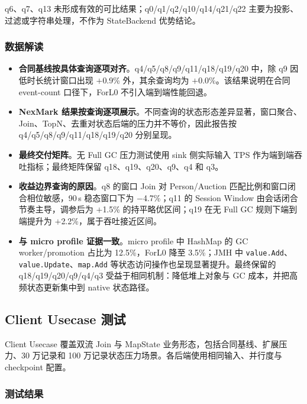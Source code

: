 \documentclass[a4paper,11pt]{article}
\begin{document}
q6、q7、q13 未形成有效的可比结果；q0/q1/q2/q10/q14/q21/q22 主要为投影、过滤或字符串处理，不作为 StateBackend 优势结论。

\subsubsection{数据解读}

\begin{itemize}
  \item \textbf{合同基线按具体查询逐项对齐}。q4/q5/q8/q9/q11/q18/q19/q20 中，除 q9 因低时长统计窗口出现 $+$0.9\% 外，其余查询均为 $+$0.0\%。该结果说明在合同 event-count 口径下，ForL0 不引入端到端性能回退。
  \item \textbf{NexMark 结果按查询逐项展示}。不同查询的状态形态差异显著，窗口聚合、Join、TopN、去重对状态后端的压力并不等价，因此报告按 q4/q5/q8/q9/q11/q18/q19/q20 分别呈现。
  \item \textbf{最终交付矩阵}。无 Full GC 压力测试使用 sink 侧实际输入 TPS 作为端到端吞吐指标；最终矩阵保留 q18、q19、q20、q9、q4 和 q3。
  \item \textbf{收益边界查询的原因}。q8 的窗口 Join 对 Person/Auction 匹配比例和窗口闭合相位敏感，90\,s 稳态窗口下为 $-$4.7\%；q11 的 Session Window 由会话闭合节奏主导，调参后为 $+$1.5\% 的持平略优区间；q19 在无 Full GC 规则下端到端提升为 $+$2.2\%，属于吞吐接近区间。
  \item \textbf{与 micro profile 证据一致}。micro profile 中 HashMap 的 GC worker/promotion 占比为 12.5\%，ForL0 降至 3.5\%；JMH 中 \texttt{value.Add}、\texttt{value.Update}、\texttt{map.Add} 等状态访问操作也呈现显著提升。最终保留的 q18/q19/q20/q9/q4/q3 受益于相同机制：降低堆上对象与 GC 成本，并把高频状态更新集中到 native 状态路径。
\end{itemize}

\subsection{Client Usecase 测试}

Client Usecase 覆盖双流 Join 与 MapState 业务形态，包括合同基线、扩展压力、30 万记录和 100 万记录状态压力场景。各后端使用相同输入、并行度与 checkpoint 配置。

\subsubsection{测试结果}
\end{document}
